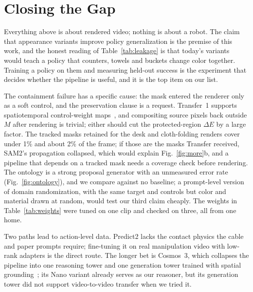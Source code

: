 \section{Closing the Gap}
\label{sec:gap}

Everything above is about rendered video; nothing is about a robot. The claim that appearance variants improve policy generalization is the premise of this work, and the honest reading of Table~\ref{tab:leakage} is that today's variants would teach a policy that counters, towels and buckets change color together. Training a policy on them and measuring held-out success is the experiment that decides whether the pipeline is useful, and it is the top item on our list.

The containment failure has a specific cause: the mask entered the renderer only as a soft control, and the preservation clause is a request. Transfer~1 supports spatiotemporal control-weight maps~\cite{cosmostransfer1}, and compositing source pixels back outside $M$ after rendering is trivial; either should cut the protected-region $\Delta E$ by a large factor. The tracked masks retained for the desk and cloth-folding renders cover under 1\% and about 2\% of the frame; if those are the masks Transfer received, SAM2's propagation collapsed, which would explain Fig.~\ref{fig:more}b, and a pipeline that depends on a tracked mask needs a coverage check before rendering. The ontology is a strong proposal generator with an unmeasured error rate (Fig.~\ref{fig:ontology}), and we compare against no baseline; a prompt-level version of domain randomization, with the same target and controls but color and material drawn at random, would test our third claim cheaply. The weights in Table~\ref{tab:weights} were tuned on one clip and checked on three, all from one home.

Two paths lead to action-level data. Predict2 lacks the contact physics the cable and paper prompts require; fine-tuning it on real manipulation video with low-rank adapters is the direct route. The longer bet is Cosmos~3, which collapses the pipeline into one reasoning tower and one generation tower trained with spatial grounding~\cite{cosmos3}; its Nano variant already serves as our reasoner, but its generation tower did not support video-to-video transfer when we tried it.
